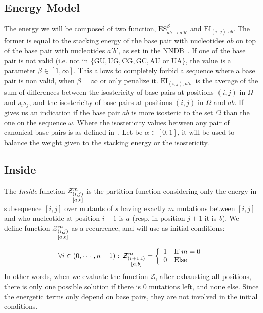 \subsection{Energy Model}
The energy we will be composed of two function, $\text{ES}^{\beta}_{ab\to a'b'}$ and 
$\text{EI}_{(i,j),ab}$. The former is equal to the 
stacking energy of the base pair with nucleotides $ab$ on top of the base pair with nucleotides 
$a'b'$, as set in the NNDB~\cite{Turner2010}. If one of the base pair is not valid (i.e. not in 
$\{\text{GU},\text{UG},\text{CG},\text{GC}, \text{AU or UA}\}$, the value is a parameter 
$\beta \in [1,\infty]$. This allows
to completely forbid a sequence where a base pair is non valid, when $\beta = \infty$ or only 
penalize it.
$\text{EI}_{(i,j), a'b'}$ is the average of the sum of differences between the isostericity
of base pairs at positions $(i,j)$ in $\Omega$ and $s_is_j$, and the isostericity of base pairs
 at positions $(i,j)$ in $\Omega$ and $ab$. If gives us an indication 
 if the base pair $ab$ is more isosteric to the set $\Omega$ than the one on the sequence 
 $\omega$. Where the isostericity values 
 between any pair of canonical base pairs is  as defined in~\cite{Stombaugh2009}. 
 Let be $\alpha\in[0,1]$, it 
 will be used to balance the weight given to the stacking energy or the isostericity.
	
\subsection{Inside}
The \emph{Inside} function $\Z{i,j}{m}{a,b}$ is the partition function considering only the 
energy in subsequence $[i,j]$ over mutants of $s$ having exactly $m$ mutations between $[i,j]$ and who nucleotide at position $i-1$ is $a$ (resp. in position $j+1$ it is $b$).
We define function $\Z{i,j}{m}{a,b}$ as a recurrence, and will use as initial conditions:

\[
	\forall i \in (0,\cdots,n-1):\, \Z{i+1,i}{m}{a,b}=\left\{
	\begin{array}{ll}
		1 &\text{If } m = 0\\
		0 &\text{Else }
	\end{array}\right.
\]
In other words, when we evaluate the function $\mathcal Z$, after exhausting all positions, there 
is only one possible solution if there is $0$ mutations left, and none else. Since the 
energetic terms only depend on base pairs, they are not involved in the initial conditions. 

